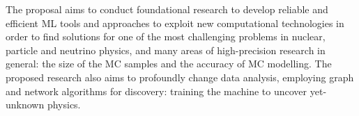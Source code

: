 The proposal aims to conduct foundational research to develop reliable and efficient ML tools and approaches to exploit new computational technologies in order to find solutions for one of the most challenging problems in nuclear, particle and neutrino physics, and many areas of high-precision research in general: the size of the MC samples and the accuracy of MC modelling. The proposed research  also aims to profoundly change data analysis, employing graph and network algorithms for discovery: training the machine to uncover yet-unknown physics.
\clearpage


